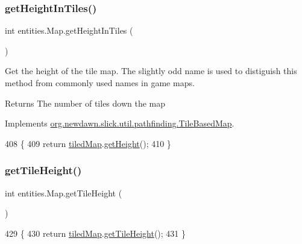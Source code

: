 \subsubsection{\texorpdfstring{get\+Height\+In\+Tiles()}{getHeightInTiles()}}
{\footnotesize\ttfamily int entities.\+Map.\+get\+Height\+In\+Tiles (\begin{DoxyParamCaption}{ }\end{DoxyParamCaption})\hspace{0.3cm}{\ttfamily [inline]}}

Get the height of the tile map. The slightly odd name is used to distiguish this method from commonly used names in game maps.

\begin{DoxyReturn}{Returns}
The number of tiles down the map 
\end{DoxyReturn}


Implements \mbox{\hyperlink{interfaceorg_1_1newdawn_1_1slick_1_1util_1_1pathfinding_1_1_tile_based_map_a9669f3dafa1ce48a20e3d7d8c1de239a}{org.\+newdawn.\+slick.\+util.\+pathfinding.\+Tile\+Based\+Map}}.


\begin{DoxyCode}
408                                   \{
409         \textcolor{keywordflow}{return} \mbox{\hyperlink{classentities_1_1_map_a94a743ccd80946422fcbdb5ba1cc966b}{tiledMap}}.\mbox{\hyperlink{classorg_1_1newdawn_1_1slick_1_1tiled_1_1_tiled_map_a6370cae21692dded6097e8f877b62cac}{getHeight}}();
410     \}
\end{DoxyCode}
\mbox{\label{classentities_1_1_map_a43c2e5888d77a6b400cc6dd2c9aa1769}} 
\subsubsection{\texorpdfstring{get\+Tile\+Height()}{getTileHeight()}}
{\footnotesize\ttfamily int entities.\+Map.\+get\+Tile\+Height (\begin{DoxyParamCaption}{ }\end{DoxyParamCaption})\hspace{0.3cm}{\ttfamily [inline]}}


\begin{DoxyCode}
429                               \{
430         \textcolor{keywordflow}{return} \mbox{\hyperlink{classentities_1_1_map_a94a743ccd80946422fcbdb5ba1cc966b}{tiledMap}}.\mbox{\hyperlink{classorg_1_1newdawn_1_1slick_1_1tiled_1_1_tiled_map_a03d0f5ea72a93c1939e97deea19a1d3a}{getTileHeight}}();
431     \}
\end{DoxyCode}
\mbox{\label{classentities_1_1_map_ada3d3610a5bdc025e1509583e0e36746}} 
